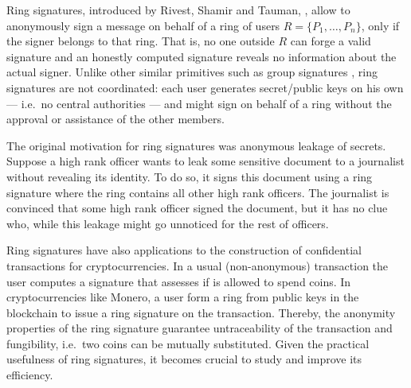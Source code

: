 
Ring signatures, introduced by Rivest, Shamir and Tauman, \cite{AC:RivShaTau01}, allow to anonymously sign a message on behalf of a ring of users $R=\{P_1,\ldots,P_n\}$, only if the signer belongs to that ring. That is, no one outside $R$ can forge a valid signature and  an honestly computed signature reveals no information about the actual signer.  
Unlike other similar primitives such as group signatures \cite{EC:ChaVan91}, ring signatures are not coordinated: each user generates secret/public keys on his own --- i.e.~no central authorities --- and might sign on behalf of a ring without the approval or assistance of the other members.

The original motivation for ring signatures was anonymous leakage of secrets. Suppose a high rank officer wants to leak some sensitive document to a journalist without revealing its identity. To do so, it signs this document using a ring signature where the ring contains all other high rank officers. The journalist is convinced that some high rank officer signed the document, but it has no clue who, while this leakage might go unnoticed for the rest of officers.

Ring signatures have also applications to the construction of confidential transactions for cryptocurrencies. In a usual (non-anonymous) transaction the user computes a signature that assesses if is allowed to spend coins. In cryptocurrencies like Monero, a user form a ring from public keys in the blockchain to issue a ring signature on the transaction. Thereby, the anonymity properties of the ring signature guarantee untraceability of the transaction and fungibility, i.e.~two coins can be mutually substituted.
Given the practical usefulness of ring signatures, it becomes crucial to study and improve its efficiency.

